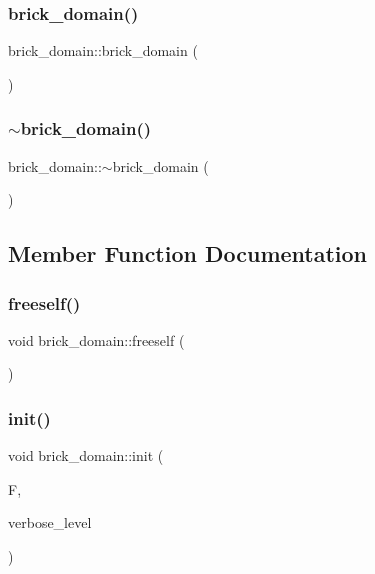 \subsubsection{\texorpdfstring{brick\+\_\+domain()}{brick\_domain()}}
{\footnotesize\ttfamily brick\+\_\+domain\+::brick\+\_\+domain (\begin{DoxyParamCaption}{ }\end{DoxyParamCaption})}

\mbox{\label{classbrick__domain_a27d9e7a77c9a49ea05c45911140fad63}} 
\subsubsection{\texorpdfstring{$\sim$brick\+\_\+domain()}{~brick\_domain()}}
{\footnotesize\ttfamily brick\+\_\+domain\+::$\sim$brick\+\_\+domain (\begin{DoxyParamCaption}{ }\end{DoxyParamCaption})}



\subsection{Member Function Documentation}
\mbox{\label{classbrick__domain_ae3198ccaf58d0db3a772cc427c31b278}} 
\subsubsection{\texorpdfstring{freeself()}{freeself()}}
{\footnotesize\ttfamily void brick\+\_\+domain\+::freeself (\begin{DoxyParamCaption}{ }\end{DoxyParamCaption})}

\mbox{\label{classbrick__domain_a1370c85e19e7da6bcb86e66184999c4a}} 
\subsubsection{\texorpdfstring{init()}{init()}}
{\footnotesize\ttfamily void brick\+\_\+domain\+::init (\begin{DoxyParamCaption}\item[{\mbox{\hyperlink{classfinite__field}{finite\+\_\+field}} $\ast$}]{F,  }\item[{\mbox{\hyperlink{galois_8h_a09fddde158a3a20bd2dcadb609de11dc}{I\+NT}}}]{verbose\+\_\+level }\end{DoxyParamCaption})}

